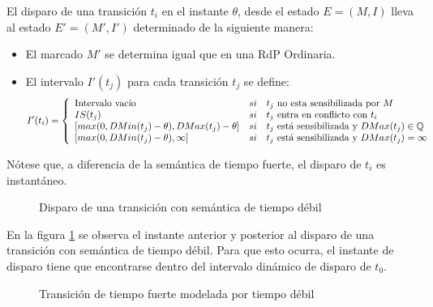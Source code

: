 El disparo de una transición $t_{i}$ en el instante $\theta$, desde el estado
$E = (M,I)$ lleva al estado $E' = (M', I')$ determinado de la siguiente manera:
\begin{itemize}
  \item El marcado $M'$ se determina igual que en una RdP Ordinaria.
  \item El intervalo $I'(t_{j})$ para cada transición $t_{j}$ se define:
  $$ I'(t_{i}) = \left\{
  \begin{array}{lll}
    \textnormal{Intervalo vacío} & si & t_{j} \textnormal{ no esta sensibilizada
    por } M \\
    IS(t_{j}) & si & t_{j} \textnormal{ entra en conflicto con } t_{i} \\
    \lbrack max(0, DMin(t_{j}) - \theta), DMax(t_{j}) - \theta \rbrack & si &
    t_{j} \textnormal{ está sensibilizada y } DMax(t_{j}) \in \mathbb{Q} \\
    \lbrack max(0, DMin(t_{j}) - \theta), \infty \rbrack & si & t_{j}
    \textnormal{ está sensibilizada y } DMax(t_{j}) = \infty \\
  \end{array}
\right.$$
\end{itemize}
Nótese que, a diferencia de la semántica de tiempo fuerte, el disparo de $t_{i}$
es instantáneo.

\begin{figure}[h]
  \centering
  \caption{Disparo de una transición con semántica de tiempo débil}
  \label{fig:disparo_tiempo_debil}
\end{figure}

En la figura \ref{fig:disparo_tiempo_debil} se observa el instante anterior y
posterior al disparo de una transición con semántica de tiempo débil. Para que
esto ocurra, el instante de disparo tiene que encontrarse dentro del intervalo
dinámico de disparo de $t_{0}$.

\begin{figure}[h]
  \centering
  \hspace*{\fill}
  \subcapcentertrue
  \hspace*{\fill}
  \caption{Transición de tiempo fuerte modelada por tiempo débil}
  \label{fig:tiempo_debil_emula_fuerte}
\end{figure}

